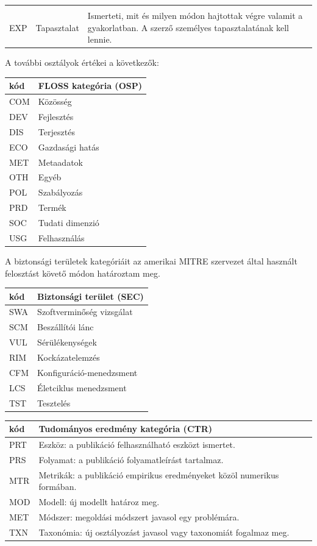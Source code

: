 \documentclass[12pt,magyar,a4paper,oneside]{scrreprt}
\begin{document}
\begin{longtable}[]{@{}lll@{}}
\begin{minipage}[t]{0.52\columnwidth}
\end{minipage}\tabularnewline
\begin{minipage}[t]{0.05\columnwidth}\raggedright
EXP\strut
\end{minipage} & \begin{minipage}[t]{0.34\columnwidth}\raggedright
Tapasztalat\strut
\end{minipage} & \begin{minipage}[t]{0.52\columnwidth}\raggedright
Ismerteti, mit és milyen módon hajtottak végre valamit a gyakorlatban. A
szerző személyes tapasztalatának kell lennie.\strut
\end{minipage}\tabularnewline
\bottomrule
\end{longtable}

A további osztályok értékei a következők:

\begin{longtable}[]{@{}ll@{}}
\toprule
kód & FLOSS kategória (OSP)\tabularnewline
\midrule
\endhead
COM & Közösség\tabularnewline
DEV & Fejlesztés\tabularnewline
DIS & Terjesztés\tabularnewline
ECO & Gazdasági hatás\tabularnewline
MET & Metaadatok\tabularnewline
OTH & Egyéb\tabularnewline
POL & Szabályozás\tabularnewline
PRD & Termék\tabularnewline
SOC & Tudati dimenzió\tabularnewline
USG & Felhasználás\tabularnewline
\bottomrule
\end{longtable}

A biztonsági területek kategóriáit az amerikai MITRE szervezet által
használt felosztást követő módon határoztam meg.

\begin{longtable}[]{@{}ll@{}}
\toprule
kód & Biztonsági terület (SEC)\tabularnewline
\midrule
\endhead
SWA & Szoftverminőség vizsgálat\tabularnewline
SCM & Beszállítói lánc\tabularnewline
VUL & Sérülékenységek\tabularnewline
RIM & Kockázatelemzés\tabularnewline
CFM & Konfiguráció-menedzsment\tabularnewline
LCS & Életciklus menedzsment\tabularnewline
TST & Tesztelés\tabularnewline
\bottomrule
\end{longtable}

\begin{longtable}[]{@{}ll@{}}
\toprule
kód & Tudományos eredmény kategória (CTR)\tabularnewline
\midrule
\endhead
PRT & Eszköz: a publikáció felhasználható eszközt
ismertet.\tabularnewline
PRS & Folyamat: a publikáció folyamatleírást tartalmaz.\tabularnewline
MTR & Metrikák: a publikáció empirikus eredményeket közöl numerikus
formában.\tabularnewline
MOD & Modell: új modellt határoz meg.\tabularnewline
MET & Módszer: megoldási módszert javasol egy problémára.\tabularnewline
TXN & Taxonómia: új osztályozást javasol vagy taxonomiát fogalmaz
meg.\tabularnewline
\bottomrule
\end{longtable}
\end{document}

